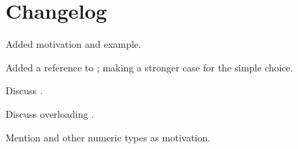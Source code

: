 \section{Changelog}
\begin{revision}
  \item Added  motivation and example.
  \item Added a reference to \cite{P0927R0}; making a stronger case for the simple choice.
\end{revision}

\begin{revision}
  \item Discuss .
  \item Discuss overloading .
  \item Mention  and other numeric types as motivation.
\end{revision}

